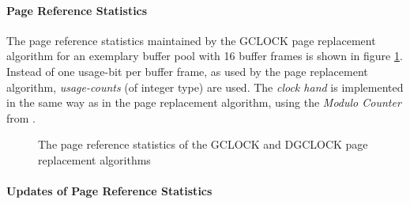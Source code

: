 \paragraph{Page Reference Statistics}

    The page reference statistics maintained by the GCLOCK page replacement algorithm for an exemplary buffer pool with 16 buffer frames is shown in figure \ref{fig:gclock}. Instead of one usage-bit per buffer frame, as used by the  page replacement algorithm, \emph{usage-counts} (of integer type) are used. The \emph{clock hand} is implemented in the same way as in the  page replacement algorithm, using the \emph{Modulo Counter} from \cite{Gilbert:2020}.

\begin{@empty}
    
    \begin{figure}[h]
        \centering
        \vspace{.75em}
        \caption[Page reference statistics of (D)GCLOCK]{The page reference statistics of the GCLOCK and DGCLOCK page replacement algorithms}
        \label{fig:gclock}
    \end{figure}
\end{@empty}

\paragraph{Updates of Page Reference Statistics}

